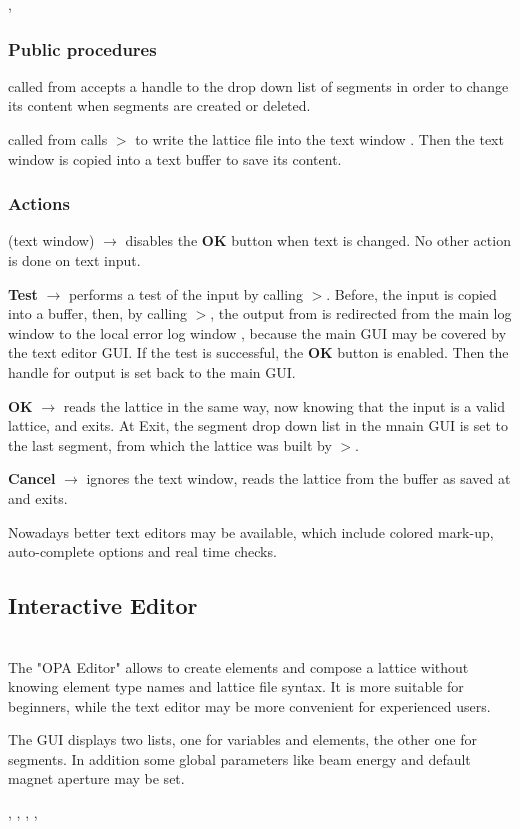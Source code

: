 \documentclass[12pt]{article}
\newcommand\code[1]{{\tt #1}}
\newcommand{\ofld}[1]{\colorbox{black!15}{{{\color{black}\bf #1}}}}
\newcommand{\ofldx}[1]{\colorbox{black!15}{{\color{black}(#1)}}}
\newcommand\guico[1]{{\color{blue}\code{#1}}}
\newcommand{\unico}[1]{{\color{burntorange}\code{#1}}}
\newcommand{\evcod}[2]{\ofld{#1} $\rightarrow$ \guico{#2}}
\newcommand{\evcodx}[2]{\ofldx{#1} $\rightarrow$ \guico{#2}}
\newcommand{\prcod}[2]{\opauni{#1}$>$\unico{#2}}
\newcommand{\opagui}[1]{\colorbox{blue!20}{{\color{black}\code{#1}}}}
\newcommand{\oguih}[2]{\subsection{\label{#2}#1}{\Huge\opagui{#2}}\\}
\newcommand{\ogui}[1]{\hyperref[#1]{\opagui{#1}}}
\newcommand{\opauni}[1]{\colorbox{orange!30}{{\color{black}\code{#1}}}}
\newcommand{\ouni}[1]{\hyperref[#1]{\opauni{#1}}}
\newcommand{\uses}[1]{\flushleft {\bf Uses:} #1}
\newcommand{\act}[1]{\subsubsection*{Actions} #1}
\newcommand{\ppro}[1]{\subsubsection*{Public procedures} #1}
\newcommand{\todo}[1]{{\color{red} #1}}
\begin{document}
\uses{\ouni{globlib}, \ouni{latfilelib}}

\ppro{
\guico{Init} called from \ogui{opamenu} accepts a handle to the drop down list of segments in order to change its content when segments are created or deleted.

\guico{LoadLattice} called from \ogui{opamenu} calls \prcod{latfilelib}{WriteLattice} to write the lattice file into the text window \guico{EdtWin}. Then the text window is copied into a text buffer to save its content.
}

\act{
\evcodx{text window}{disableOKBut} disables the \ofld{OK} button when text is changed. No other action is done on text input.

\evcod{Test}{filetest} performs a test of the input by calling \prcod{latfilelib}{LatRead}. Before, the input is copied into a buffer, then, by calling \prcod{globlib}{PassErrLogHandle}, the output from \unico{LatRead} is redirected from the \ogui{opamenu} main log window to the local error log window \guico{myerrlog}, because the main GUI may be covered by the text editor GUI. If the test is successful, the \ofld{OK} button is enabled. Then the handle for output is set back to the main GUI.


\evcod{OK}{fileget} reads the lattice in the same way, now knowing that the input is a valid lattice, and exits. At Exit, the segment drop down list in the mnain GUI is set to the last segment, from which the lattice was built by \prcod{latfilelib}{LatRead}.

\evcod{Cancel}{fileRestore} ignores the text window, reads the lattice from the buffer as saved at \guico{Init} and exits.

}

\todo{Nowadays better text editors may be available, which include colored mark-up, auto-complete options and real time checks.}

\oguih{Interactive Editor}{opaeditor}

The "OPA Editor" allows to create elements and compose a lattice without knowing element type names and lattice file syntax. It is more suitable for beginners, while the text editor may be more convenient for experienced users.

The GUI displays two lists, one for variables and elements, the other one for segments. In addition some global parameters like beam energy and default magnet aperture may be set.

\uses{\ouni{globlib}, \ogui{oelecreate}, \ogui{oeleedit}, \ogui{osegedit}, \ouni{../com/asaux}}
\end{document}
